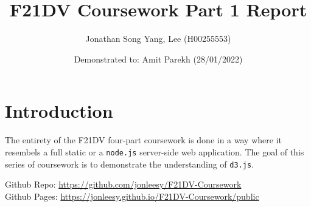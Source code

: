 \documentclass{scrreprt}
\title{F21DV Coursework Part 1 Report}
\author{Jonathan Song Yang, Lee (H00255553)}
\date{Demonstrated to: Amit Parekh (28/01/2022)}
\begin{document}
\maketitle

\newpage
\tableofcontents


\newpage
\chapter{Introduction}
The entirety of the F21DV four-part coursework is done in a way where it resembels
a full static or a \verb|node.js| server-side web application. The goal of this
series of coursework is to demonstrate the understanding of \verb|d3.js|.\\
\par Github Repo: \href{https://github.com/jonleesy/F21DV-Coursework}{https://github.com/jonleesy/F21DV-Coursework}\\
Github Pages: \href{https://jonleesy.github.io/F21DV-Coursework/public}{https://jonleesy.github.io/F21DV-Coursework/public}
\end{document}
